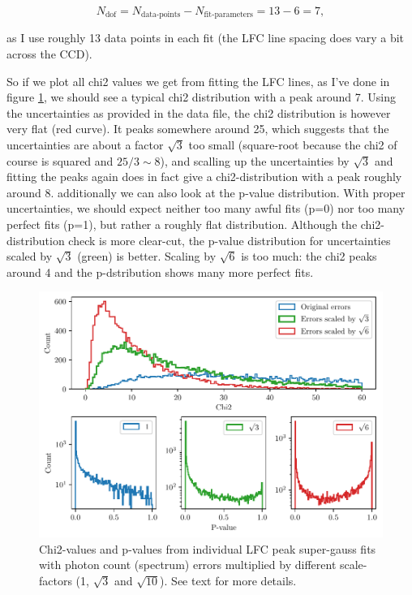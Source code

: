     \begin{equation}
        \label{eq:ndof}
        N_\text{dof} = N_\text{data-points} - N_\text{fit-parameters} =  13 - 6 = 7,
    \end{equation}

    as I use roughly 13 data points in each fit (the LFC line spacing does vary a bit across the CCD). 

    So if we plot all chi2 values we get from fitting the LFC lines, as I've done in figure \ref{fig:calib_errors}, we should see a typical chi2 distribution with a peak around 7. Using the uncertainties as provided in the data file, the chi2 distribution is however very flat (red curve). It peaks somewhere around 25, which suggests that the uncertainties are about a factor $\sqrt{3}$ too small (square-root because the chi2 of course is squared and $25/3 \sim 8$), and scalling up the uncertainties by $\sqrt{3}$ and fitting the peaks again does in fact give a chi2-distribution with a peak roughly around 8.
    additionally we can also look at the p-value distribution. With proper uncertainties, we should expect neither too many awful fits (p=0) nor too many perfect fits (p=1), but rather a roughly flat distribution. Although the chi2-distribution check is more clear-cut, the p-value distribution for uncertainties scaled by $\sqrt{3}$ (green) is better. Scaling by $\sqrt{6}$ is too much: the chi2 peaks around 4 and the p-dstribution shows many more perfect fits.
                
    \begin{figure}%
        \begin{wide}  
            \includegraphics[width=\textwidth]{figures/calib/calib_errors2.pdf}
            \caption{Chi2-values and p-values from individual LFC peak super-gauss fits with photon count (spectrum) errors multiplied by different scale-factors (1, $\sqrt{3}$ and $\sqrt{10}$). See text for more details.}
        \label{fig:calib_errors}
        \end{wide}
    \end{figure}

